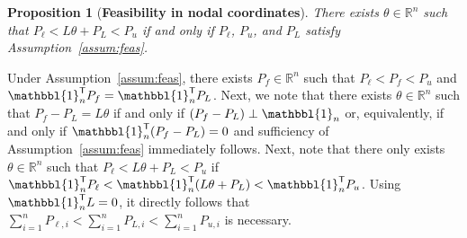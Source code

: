 \documentclass[twocolumn,twoside,journal]{IEEEtran}
\newtheorem{proposition}{Proposition}
\begin{document}
\begin{proposition}[\textbf{Feasibility in nodal coordinates}]\label{prop:feas}
    There exists $\theta \in \mathbb{R}^n$ such that $P_{\ell} < L\theta + P_{L} < P_{u}$ if and only if $P_\ell$, $P_u$, and $P_L$ satisfy Assumption~\ref{assum:feas}.
\end{proposition}
\begin{IEEEproof}
   Under Assumption~\ref{assum:feas}, there exists $P_f \in \mathbb{R}^n$ such that $P_\ell < P_f < P_u$ and $\mathbbl{1}_n^\mathsf{T} P_f = \mathbbl{1}_n^\mathsf{T} P_L$. Next, we note that there exists $\theta \in \mathbb{R}^n$ such that $P_f-P_L = L \theta$ if and only if $(P_f-P_L) \perp \mathbbl{1}_n$ \cite[Lem.~6.12]{LNS} or, equivalently, if and only if $\mathbbl{1}_n^\mathsf{T} (P_f-P_L) = 0$ and sufficiency of Assumption~\ref{assum:feas} immediately follows. Next, note that there only exists $\theta \in \mathbb{R}^n$ such that $P_{\ell} < L\theta + P_{L} < P_{u}$ if   
   $\mathbbl{1}_n^\mathsf{T} P_\ell < \mathbbl{1}_n^\mathsf{T} (L \theta + P_L) < \mathbbl{1}_n^\mathsf{T} P_u$. Using $\mathbbl{1}_n^\mathsf{T} L = 0$, it directly follows that $\sum_{i=1}^n P_{\ell,i} < \sum_{i=1}^n  P_{L,i} < \sum_{i=1}^n P_{u,i}$ is necessary.
\end{IEEEproof}
\end{document}
